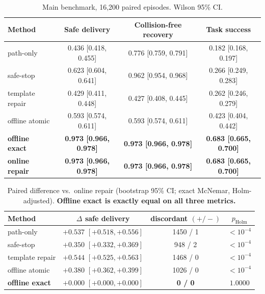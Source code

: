 \documentclass[11pt]{article}
\begin{document}
\begin{table}[htbp]\centering
\caption{Main benchmark, 16{,}200 paired episodes. Wilson 95\% CI.}
\begin{tabular}{lccc}
\toprule
Method & Safe delivery & Collision-free recovery & Task success \\
\midrule
path-only            & 0.436 [0.418, 0.455] & 0.776 [0.759, 0.791] & 0.182 [0.168, 0.197] \\
safe-stop            & 0.623 [0.604, 0.641] & 0.962 [0.954, 0.968] & 0.266 [0.249, 0.283] \\
template repair      & 0.429 [0.411, 0.448] & 0.427 [0.408, 0.445] & 0.262 [0.246, 0.279] \\
offline atomic       & 0.593 [0.574, 0.611] & 0.593 [0.574, 0.611] & 0.423 [0.404, 0.442] \\
\textbf{offline exact} & \textbf{0.973 [0.966, 0.978]} & \textbf{0.973 [0.966, 0.978]} & \textbf{0.683 [0.665, 0.700]} \\
\textbf{online repair} & \textbf{0.973 [0.966, 0.978]} & \textbf{0.973 [0.966, 0.978]} & \textbf{0.683 [0.665, 0.700]} \\
\bottomrule
\end{tabular}
\end{table}

\begin{table}[htbp]\centering
\caption{Paired difference vs.\ online repair (bootstrap 95\% CI; exact McNemar,
Holm-adjusted). \textbf{Offline exact is exactly equal on all three metrics.}}
\begin{tabular}{lccc}
\toprule
Method & $\Delta$ safe delivery & discordant $(+/-)$ & $p_{\mathrm{Holm}}$ \\
\midrule
path-only        & $+0.537$ $[+0.518,+0.556]$ & 1450 / 1 & $<10^{-4}$ \\
safe-stop        & $+0.350$ $[+0.332,+0.369]$ & 948 / 2  & $<10^{-4}$ \\
template repair  & $+0.544$ $[+0.525,+0.563]$ & 1468 / 0 & $<10^{-4}$ \\
offline atomic   & $+0.380$ $[+0.362,+0.399]$ & 1026 / 0 & $<10^{-4}$ \\
\textbf{offline exact} & $\mathbf{+0.000}$ $[+0.000,+0.000]$ & \textbf{0 / 0} & $\mathbf{1.0000}$ \\
\bottomrule
\end{tabular}
\end{table}
\end{document}
